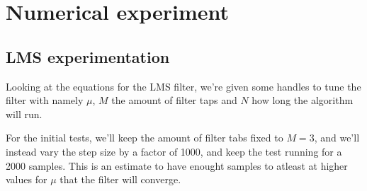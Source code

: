 \section{Numerical experiment}
\subsection{LMS experimentation}
Looking at the equations for the LMS filter, we're given some handles to tune the filter with
namely $\mu$, $M$ the amount of filter taps and $N$ how long the algorithm will run.

For the initial tests, we'll keep the amount of filter tabs fixed to $M=3$, and we'll instead 
vary the step size by a factor of 1000, and keep the test running for a 2000 samples. This is an
estimate to have enought samples to atleast at higher values for $\mu$ that the filter will converge.

